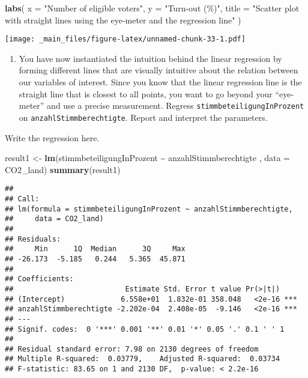 \documentclass[
]{book}
\newenvironment{Shaded}{\begin{snugshade}}{\end{snugshade}}
\newcommand{\AttributeTok}[1]{\textcolor[rgb]{0.13,0.29,0.53}{#1}}
\newcommand{\FunctionTok}[1]{\textcolor[rgb]{0.13,0.29,0.53}{\textbf{#1}}}
\newcommand{\NormalTok}[1]{#1}
\newcommand{\OtherTok}[1]{\textcolor[rgb]{0.56,0.35,0.01}{#1}}
\newcommand{\SpecialCharTok}[1]{\textcolor[rgb]{0.81,0.36,0.00}{\textbf{#1}}}
\newcommand{\StringTok}[1]{\textcolor[rgb]{0.31,0.60,0.02}{#1}}
\providecommand{\tightlist}{%
  \setlength{\itemsep}{0pt}\setlength{\parskip}{0pt}}
\begin{document}
\begin{Shaded}
\begin{Highlighting}[]
  \FunctionTok{labs}\NormalTok{(}
    \AttributeTok{x =} \StringTok{"Number of eligible voters"}\NormalTok{,}
    \AttributeTok{y =} \StringTok{"Turn{-}out (\%)"}\NormalTok{,}
    \AttributeTok{title =} \StringTok{"Scatter plot with straight lines using the eye{-}meter and the regression line"}
\NormalTok{  )}
\end{Highlighting}
\end{Shaded}

\texttt{[image: \_main\_files/figure-latex/unnamed-chunk-33-1.pdf]}

\begin{enumerate}
\def\labelenumi{\roman{enumi}.}
\setcounter{enumi}{2}
\tightlist
\item
  You have now instantiated the intuition behind the linear regression by forming different lines that are visually intuitive about the relation between our variables of interest. Since you know that the linear regression line is the straight line that is closest to all points, you want to go beyond your ``eye-meter'' and use a precise measurement. Regress \texttt{stimmbeteiligungInProzent} on \texttt{anzahlStimmberechtigte}. Report and interpret the parameters.
\end{enumerate}

Write the regression here.

\begin{Shaded}
\begin{Highlighting}[]
\NormalTok{result1 }\OtherTok{\textless{}{-}} \FunctionTok{lm}\NormalTok{(stimmbeteiligungInProzent }\SpecialCharTok{\textasciitilde{}}\NormalTok{ anzahlStimmberechtigte , }\AttributeTok{data =}\NormalTok{ CO2\_land)}
\FunctionTok{summary}\NormalTok{(result1)}
\end{Highlighting}
\end{Shaded}

\begin{verbatim}
## 
## Call:
## lm(formula = stimmbeteiligungInProzent ~ anzahlStimmberechtigte, 
##     data = CO2_land)
## 
## Residuals:
##     Min      1Q  Median      3Q     Max 
## -26.173  -5.185   0.244   5.365  45.871 
## 
## Coefficients:
##                          Estimate Std. Error t value Pr(>|t|)    
## (Intercept)             6.558e+01  1.832e-01 358.048   <2e-16 ***
## anzahlStimmberechtigte -2.202e-04  2.408e-05  -9.146   <2e-16 ***
## ---
## Signif. codes:  0 '***' 0.001 '**' 0.01 '*' 0.05 '.' 0.1 ' ' 1
## 
## Residual standard error: 7.98 on 2130 degrees of freedom
## Multiple R-squared:  0.03779,    Adjusted R-squared:  0.03734 
## F-statistic: 83.65 on 1 and 2130 DF,  p-value: < 2.2e-16
\end{verbatim}
\end{document}

